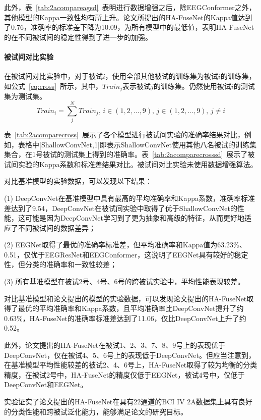 此外，表~\ref{tab:2acompareagsd}~表明进行数据增强之后，除EEGConformer之外，其他模型的Kappa一致性均有所上升。论文所提出的HA-FuseNet的Kappa值达到了0.76，准确率的标准差下降为10.09，为所有模型中的最低值，表明HA-FuseNet的在不同被试间的稳定性得到了进一步的加强。

\paragraph{被试间对比实验}

在被试间对比实验中，对于被试\(i\)，使用全部其他被试的训练集为被试\(i\)的训练集，如公式~\ref{eq:cross}~所示，其中，\(Train_j\)表示被试\(j\)的训练集。仍然使用被试\(i\)的测试集为测试集。
\begin{equation}
    \label{eq:cross}
    Train_i=\sum_{j}^{N}Train_j,\,i \in (1,2,...,9),\,j \in (1,2,...,9),\,j \neq i
\end{equation}

表~\ref{tab:2acomparecross}~展示了各个模型进行被试间实验的准确率结果对比，例如，表格中[ShallowConvNet,1]即表示ShallowConvNet使用其他八名被试的训练集集合，在1号被试的测试集上得到的准确率。表~\ref{tab:2acomparecrosssd}~展示了被试间实验的Kappa系数和标准差结果对比。被试间对比实验未使用数据增强算法。

对比基准模型的实验数据，可以发现以下结果：

(1) DeepConvNet在基准模型中具有最高的平均准确率和Kappa系数，准确率标准差达到了9.54，DeepConvNet在被试间实验中取得了优于ShallowConvNet的性能，这可能是因为DeepConvNet学习到了更为抽象和高级的特征，从而更好地适应了不同被试间的数据差异；

(2) EEGNet取得了最优的准确率标准差，但平均准确率和Kappa值为63.23\%、0.51，仅优于EEGResNet和EEGConformer，这说明了EEGNet具有较好的稳定性，但分类的准确率和一致性较差；

(3) 所有基准模型在被试2号、4号、6号的跨被试实验中，平均性能表现较差。

对比基准模型和论文提出的模型的实验数据，可以发现论文提出的HA-FuseNet取得了最优的平均准确率和Kappa系数，且平均准确率比DeepConvNet提升了约0.63\%，HA-FuseNet的准确率标准差达到了11.06，仅比DeepConvNet上升了约0.52。

此外，论文提出的HA-FuseNet在被试1、2、3、7、8、9号上的表现优于DeepConvNet，仅在被试4、5、6号上的表现低于DeepConvNet。但应当注意到，在基准模型平均性能较差的被试2、4、6号上，HA-FuseNet取得了较为均衡的分类精度，在被试2号中，HA-FuseNet的精度仅低于EEGNet，被试4号中，仅低于DeepConvNet和EEGNet。

实验证实了论文提出的HA-FuseNet在具有22通道的BCI IV 2A数据集上具有良好的分类性能和跨被试泛化能力，能够满足论文的研究目标。

